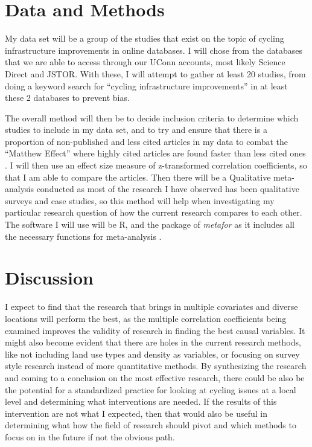 \documentclass[12pt, letterpaper]{article}
\begin{document}
\section{Data and Methods}
\label{sec:dependence}

My data set will be a group of the studies that exist on the topic of cycling infrastructure improvements in online databases. I will chose from the databases that we are able to access through our UConn accounts, most likely Science Direct and JSTOR. With these, I will attempt to gather at least 20 studies, from doing a keyword search for “cycling infrastructure improvements” in at least these 2 databases to prevent bias. 

The overall method will then be to decide inclusion criteria to determine which studies to include in my data set, and to try and ensure that there is a proportion of non-published and less cited articles in my data to combat the “Matthew Effect” where highly cited articles are found faster than less cited ones \cite{Hansen2022}. I will then use an effect size measure of z-transformed correlation coefficients, so that I am able to compare the articles. Then there will be a Qualitative meta-analysis conducted as most of the research I have observed has been qualitative surveys and case studies, so this method will help when investigating my particular research question of how the current research compares to each other. The software I will use will be R, and the package of {\em metafor} as it includes all the necessary functions for meta-analysis \cite{Hansen2022}. 


\section{Discussion}
\label{sec:fittedwithdependence}

I expect to find that the research that brings in multiple covariates and diverse locations will perform the best, as the multiple correlation coefficients being examined improves the validity of research in finding the best causal variables. It might also become evident that there are holes in the current research methods, like not including land use types and density as variables, or focusing on survey style research instead of more quantitative methods. By synthesizing the research and coming to a conclusion on the most effective research, there could be also be the potential for a standardized practice for looking at cycling issues at a local level and determining what interventions are needed. If the results of this intervention are not what I expected, then that would also be useful in determining what how the field of research should pivot and which methods to focus on in the future if not the obvious path. 
\end{document}
